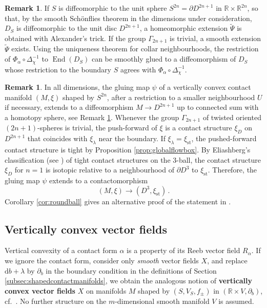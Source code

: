 \documentclass{amsart}
\theoremstyle{definition}
\newtheorem{rem}[prop]{Remark}
\newcommand{\rmd}{\mathrm d}
\newcommand{\R}{\mathbb R}
\newcommand{\lra}{\longrightarrow}
\newcommand{\ra}{\rightarrow}
\DeclareMathOperator{\End}{\mathrm{End}}
\DeclareMathOperator{\st}{\mathrm{st}}
\begin{document}
\begin{rem}
\label{rem:exotic}
If $S$ is diffeomorphic to the unit sphere
$S^{2n}=\partial D^{2n+1}$ in $\R\times\R^{2n}$,
so that, by the smooth Sch\"onflies theorem \cite{sm61}
in the dimensions under consideration,
$D_S$ is diffeomorphic to the unit disc $D^{2n+1}$,
a homeomorphic extension $\tilde{\Psi}$
is obtained with Alexander's trick.
If the group $\Gamma_{2n+1}$ is trivial,
a smooth extension $\tilde{\Psi}$ exists.
Using the uniqueness theorem for collar neighbourhoods,
the restriction of
$\Phi_{\alpha}\circ\Delta_{\chi}^{-1}$
to $\End(D_S)$ can be smoothly glued
to a diffeomorphism of $D_S$
whose restriction to the boundary $S$
agrees with
$\Phi_{\alpha}\circ\Delta_{\chi}^{-1}$.
\end{rem}


\begin{rem}
\label{rem:alternative}
In all dimensions,
the gluing map $\psi$
of a vertically convex contact manifold $(M,\xi)$
shaped by $S^{2n}$,
after a restriction to a smaller neighbourhood $U$ if necessary,
extends to a diffeomorphism $M\ra D^{2n+1}$
up to connected sum with a homotopy sphere,
see Remark \ref{rem:exotic}.
Whenever the group $\Gamma_{2n+1}$ 
of twisted oriented $(2n+1)$-spheres is trivial,
the push-forward of $\xi$
is a contact structure $\xi_{D}$ on $D^{2n+1}$
that coincides with $\xi_{\lambda}$ near the boundary.
If $\xi_{\lambda}=\xi_{\st}$,
the pushed-forward contact structure is tight
by Proposition \ref{prop:globalflowbox}.
By Eliashberg's classification \cite[Theorem~4.10.1(b)]{gei08}
(see \cite[Theorem~2.1.3]{elia92})
of tight contact structures on the $3$-ball,
the contact structure $\xi_{D}$ for $n=1$
is isotopic relative to a neighbourhood of $\partial D^3$
to $\xi_{\st}$.
Therefore, the gluing map $\psi$
extends to a contactomorphism
\[
(M,\xi)\lra(D^3,\xi_{\st})
\,.
\]
Corollary \ref{cor:roundball}
gives an alternative proof of the statement in
\cite[p.\ 1305, Item~1.b)]{eh94}.
\end{rem}



\subsection{Vertically convex vector fields\label{subsec:vertconvectfds}}

Vertical convexity of a contact form $\alpha$
is a property of its Reeb vector field $R_{\alpha}$.
If we ignore the contact form,
consider only {\it smooth} vector fields $X$,
and replace $\rmd b+\lambda$ by $\partial_b$
in the boundary condition in the definitions of 
Section \ref{subsec:shapedcontactmanifolds},
we obtain the analogous notion of
{\bf vertically convex vector fields} $X$
on manifolds $M$ shaped by $(S,V_S,f_{\pm})$
in $(\R\times V,\partial_b)$,
cf.\ \cite{buck26}.
No further structure on the
$m$-dimensional smooth manifold $V$ is assumed.
\end{document}
